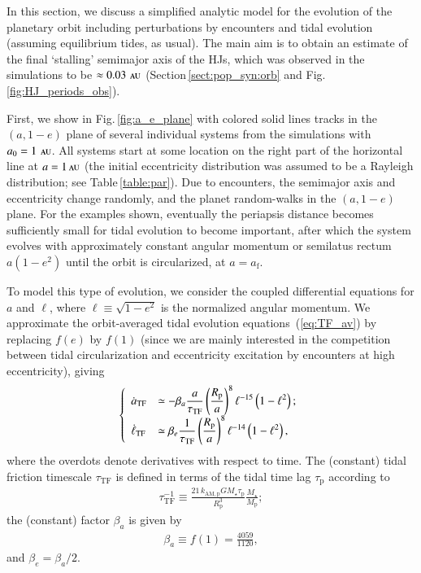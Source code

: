\documentclass[iop,usenatbib]{emulateapj}
\renewcommand{\S}{Section}
\newcommand{\F}{Fig.}
\newcommand{\au}{\,\textsc{au}}
\begin{document}
In this section, we discuss a simplified analytic model for the evolution of the planetary orbit including perturbations by encounters and tidal evolution (assuming equilibrium tides, as usual). The main aim is to obtain an estimate of the final `stalling' semimajor axis of the HJs, which was observed in the simulations to be $\approx 0.03\,\au$ (\S\,\ref{sect:pop_syn:orb} and \F\,\ref{fig:HJ_periods_obs}). 

First, we show in \F\,\ref{fig:a_e_plane} with colored solid lines tracks in the $(a,1-e)$ plane of several individual systems from the simulations with $a_0=1\,\au$. All systems start at some location on the right part of the horizontal line at $a = 1 \au$ (the initial eccentricity distribution was assumed to be a Rayleigh distribution; see Table\,\ref{table:par}). Due to encounters, the semimajor axis and eccentricity change randomly, and the planet random-walks in the $(a,1-e)$ plane. For the examples shown, eventually the periapsis distance becomes sufficiently small for tidal evolution to become important, after which the system evolves with approximately constant angular momentum or semilatus rectum $a\left(1-e^2\right)$ until the orbit is circularized, at $a = a_\mathrm{f}$.

To model this type of evolution, we consider the coupled differential equations for $a$ and $\ell$, where $\ell \equiv \sqrt{1-e^2}$ is the normalized angular momentum. We approximate the orbit-averaged tidal evolution equations~(\ref{eq:TF_av}) by replacing $f(e)$ by $f(1)$ (since we are mainly interested in the competition between tidal circularization and eccentricity excitation by encounters at high eccentricity), giving
\begin{align}
\label{eq:dif_a_ell_TF}
\left \{
\begin{array}{l>{\displaystyle}l}
\dot{a}_{\mathrm{TF}} &\simeq - \beta_a \frac{a}{\tau_\mathrm{TF}} \left ( \frac{R_\mathrm{p}}{a} \right )^8 \ell^{-15} \left(1-\ell^2\right); \\
\dot{\ell}_{\mathrm{TF}} &\simeq \beta_e \frac{1}{\tau_\mathrm{TF}} \left ( \frac{R_\mathrm{p}}{a} \right )^8 \ell^{-14} \left(1-\ell^2\right), \\
\end{array}
\right .
\end{align}
where the overdots denote derivatives with respect to time. The (constant) tidal friction timescale $\tau_\mathrm{TF}$ is defined in terms of the tidal time lag $\tau_\mathrm{p}$ according to
\begin{align}
\tau_\mathrm{TF}^{-1} \equiv \frac{ 21 \, k_\mathrm{AM,p} G M_\star \tau_\mathrm{p}}{R_\mathrm{p}^3} \frac{M_\star}{M_\mathrm{p}};
\end{align}
the (constant) factor $\beta_a$ is given by 
\begin{align}
\beta_a \equiv f(1) = \frac{4059}{1120},
\end{align}
and $\beta_e = \beta_a/2$.
\end{document}
